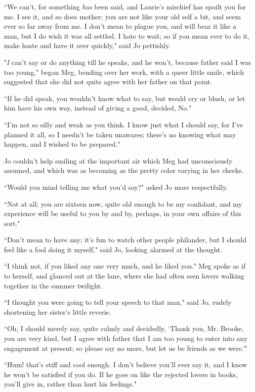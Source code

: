 ``We can't, for something \emph{has} been said, and
Laurie's mischief has spoilt you for me. I see it, and
so does mother; you are not like your old self a bit, and seem ever so
far away from me. I don't mean to plague you, and will
bear it like a man, but I do wish it was all settled. I hate to wait; so
if you mean ever to do it, make haste and have it over quickly," said Jo
pettishly.

"\emph{I} can't say or do anything till he speaks, and
he won't, because father said I was too young," began
Meg, bending over her work, with a queer little smile, which suggested
that she did not quite agree with her father on that point.

``If he did speak, you wouldn't know what to say, but
would cry or blush, or let him have his own way, instead of giving a
good, decided, No."

``I'm not so silly and weak as you think. I know just
what I should say, for I've planned it all, so I
needn't be taken unawares; there's no
knowing what may happen, and I wished to be prepared."

Jo couldn't help smiling at the important air which Meg
had unconsciously assumed, and which was as becoming as the pretty color
varying in her cheeks.

``Would you mind telling me what you'd say?" asked Jo
more respectfully.

``Not at all; you are sixteen now, quite old enough to be my confidant,
and my experience will be useful to you by and by, perhaps, in your own
affairs of this sort."

``Don't mean to have any; it's fun to
watch other people philander, but I should feel like a fool doing it
myself," said Jo, looking alarmed at the thought.

``I think not, if you liked any one very much, and he liked you." Meg
spoke as if to herself, and glanced out at the lane, where she had often
seen lovers walking together in the summer twilight.

``I thought you were going to tell your speech to that man," said Jo,
rudely shortening her sister's little reverie.

``Oh, I should merely say, quite calmly and decidedly,
`Thank you, Mr. Brooke, you are very kind, but I agree
with father that I am too young to enter into any engagement at present;
so please say no more, but let us be friends as we
were.'"

``Hum! that's stiff and cool enough. I
don't believe you'll ever say it, and I
know he won't be satisfied if you do. If he goes on like
the rejected lovers in books, you'll give in, rather
than hurt his feelings."

